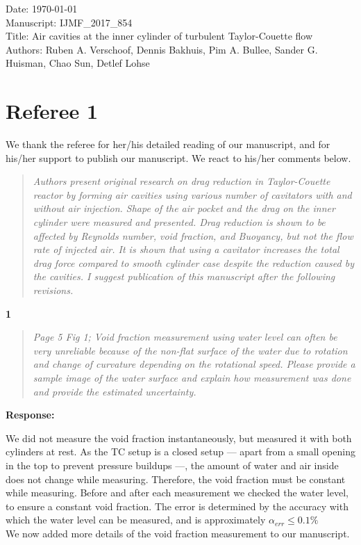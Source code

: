 \documentclass[10pt]{article}
\newcommand{\strong}[1]{\textbf{#1}}
\newcommand{\question}[1]{\begin{quote} \emph{#1}  \end{quote} }
\begin{document}
\noindent Date: \today \\
Manuscript: IJMF\_2017\_854\\
Title: Air cavities at the inner cylinder of turbulent Taylor-Couette flow \\
Authors: Ruben A. Verschoof, Dennis Bakhuis, Pim A. Bullee, Sander G. Huisman, Chao Sun, Detlef Lohse

\vspace*{1.25cm}
\section*{Referee 1}
We thank the referee for her/his detailed reading of our manuscript, and for his/her support to publish our manuscript. We react to his/her comments below.

\question{Authors present original research on drag reduction in Taylor-Couette reactor by forming air cavities using various number of cavitators with and without air injection. Shape of the air pocket and the drag on the inner cylinder were measured and presented. Drag reduction is shown to be affected by Reynolds number, void fraction, and Buoyancy, but not the flow rate of injected air. It is shown that using a cavitator increases the total drag force compared to smooth cylinder case despite the reduction caused by the cavities. I suggest publication of this manuscript after the following revisions.}


\noindent \strong{1}

\question{Page 5 Fig 1; Void fraction measurement using water level can often be very unreliable because of the non-flat surface of the water due to rotation and change of curvature depending on the rotational speed. Please provide a sample image of the water surface and explain how measurement was done and provide the estimated uncertainty. }

\noindent \strong{Response:} 

\noindent We did not measure the void fraction instantaneously, but measured it with both cylinders at rest. As the TC setup is a closed setup --- apart from a small opening in the top to prevent pressure buildups ---, the amount of water and air inside does not change while measuring. Therefore, the void fraction must be constant while measuring. Before and after each measurement we checked the water level, to ensure a constant void fraction. The error is determined by the accuracy with which the water level can be measured, and is approximately $\alpha_{err} \leq 0.1 \%$\\
We now added more details of the void fraction measurement to our manuscript.\\
	 
\end{document}

